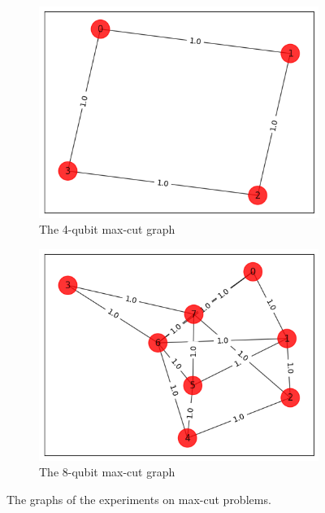 \documentclass{article} %
\begin{document}
\begin{figure}[ht]
\begin{center}
    \begin{subfigure}[b]{0.4\textwidth}
    \centering
    \includegraphics[width=\textwidth]{images/4-qubit-max_cut.png} %
    \caption{The 4-qubit max-cut graph} 
    \end{subfigure}
    \hspace{1cm}
    \begin{subfigure}[b]{0.4\textwidth}
    \centering
    \includegraphics[width=\textwidth]{images/8-qubit-max_cut.png}
    \caption{The 8-qubit max-cut graph} 
    \end{subfigure}
    \caption{The graphs of the experiments on max-cut problems.}
    \label{maxcut_graph}  
\end{center}
\end{figure}
\end{document}
